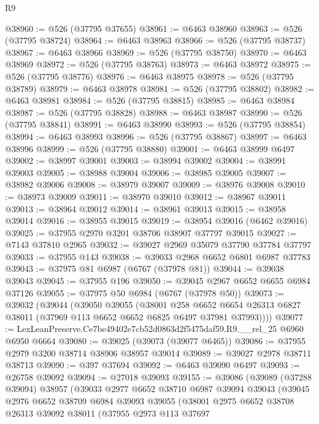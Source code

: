 \begin{lexlean}{R9}
\begin{coremodule}
@38960 := @526 (@37795 @37655)
@38961 := @6463 @38960
@38963 := @526 (@37795 @38724)
@38964 := @6463 @38963
@38966 := @526 (@37795 @38737)
@38967 := @6463 @38966
@38969 := @526 (@37795 @38750)
@38970 := @6463 @38969
@38972 := @526 (@37795 @38763)
@38973 := @6463 @38972
@38975 := @526 (@37795 @38776)
@38976 := @6463 @38975
@38978 := @526 (@37795 @38789)
@38979 := @6463 @38978
@38981 := @526 (@37795 @38802)
@38982 := @6463 @38981
@38984 := @526 (@37795 @38815)
@38985 := @6463 @38984
@38987 := @526 (@37795 @38828)
@38988 := @6463 @38987
@38990 := @526 (@37795 @38841)
@38991 := @6463 @38990
@38993 := @526 (@37795 @38854)
@38994 := @6463 @38993
@38996 := @526 (@37795 @38867)
@38997 := @6463 @38996
@38999 := @526 (@37795 @38880)
@39001 := @6463 @38999 @6497
@39002 := @38997 @39001
@39003 := @38994 @39002
@39004 := @38991 @39003
@39005 := @38988 @39004
@39006 := @38985 @39005
@39007 := @38982 @39006
@39008 := @38979 @39007
@39009 := @38976 @39008
@39010 := @38973 @39009
@39011 := @38970 @39010
@39012 := @38967 @39011
@39013 := @38964 @39012
@39014 := @38961 @39013
@39015 := @38958 @39014
@39016 := @38955 @39015
@39019 := @38954 @39016 (@6462 @39016)
@39025 := @37955 @2970 @3201 @38706 @38907 @37797 @39015
@39027 := @7143 @37810 @2965
@39032 := @39027 @2969 @35079 @37790 @37784 @37797
@39033 := @37955 @143
@39038 := @39033 @2968 @6652 @6801 @6987 @37783
@39043 := @37975 @81 @6987 (@6767 (@37978 @81))
@39044 := @39038 @39043
@39045 := @37955 @196
@39050 := @39045 @2967 @6652 @6655 @6984 @37126
@39055 := @37975 @50 @6984 (@6767 (@37978 @50))
@39073 := @39032
    (@39044
      (@39050
        @39055
        (@38001
          @258
          @6652
          @6654
          @26313
          @6827
          @38011
          (@37969 @113 @6652 @6652 @6825 @6497 @37981 @37993))))
@39077 := LexLeanPreserve.Ce7be49402e7cb52d0863d2f5475daf59.R9.__rel_25 @6960 @6950 @6664
@39080 := @39025 (@39073 (@39077 @6465))
@39086 := @37955 @2979 @3200 @38714 @38906 @38957 @39014
@39089 := @39027 @2978 @38711 @38713
@39090 := @397 @37694
@39092 := @6463 @39090 @6497
@39093 := @26758 @39092
@39094 := @27018 @39093
@39155 := @39086
    (@39089
      (@37288 @39094)
      @38957
      (@39033
        @2977
        @6652
        @38710
        @6987
        @39094
        @39043
        (@39045
          @2976
          @6652
          @38709
          @6984
          @39093
          @39055
          (@38001
            @2975
            @6652
            @38708
            @26313
            @39092
            @38011
            (@37955
              @2973
              @113
              @37697

\end{coremodule}
\end{lexlean}
